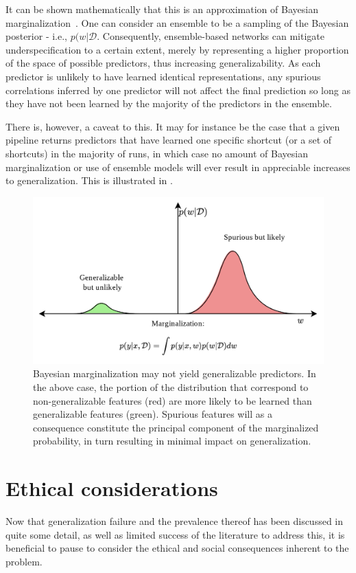 It can be shown mathematically that this is an approximation of Bayesian marginalization~\cite{bayesian_case,bayesian_generalization}. One can consider an ensemble to be a sampling of the Bayesian posterior - i.e., \(p(w | \mathcal{D}\).  Consequently, ensemble-based networks can mitigate underspecification to a certain extent, merely by representing a higher proportion of the space of possible predictors, thus increasing generalizability. As each predictor is unlikely to have learned identical representations, any spurious correlations inferred by one predictor will not affect the final prediction so long as they have not been learned by the majority of the predictors in the ensemble.

There is, however, a caveat to this. It may for instance be the case that a given pipeline returns predictors that have learned one specific shortcut (or a set of shortcuts) in the majority of runs, in which case no amount of Bayesian marginalization or use of ensemble models will ever result in appreciable increases to generalization. This is illustrated in . 
\begin{figure}[htb]
    \centering
    \includegraphics[width=\linewidth]{illustrations/bayesian.png}
    \caption[Bayesian Marginalization and Generalization]{Bayesian marginalization may not yield generalizable predictors. In the above case, the portion of the distribution that correspond to non-generalizable features (red) are more likely to be learned than generalizable features (green). Spurious features will as a consequence constitute the principal component of the marginalized probability, in turn resulting in minimal impact on generalization.}
    \label{fig:bayesian_generalization}
\end{figure}


\section{Ethical considerations}\label{ethics}
    Now that generalization failure and the prevalence thereof has been discussed in quite some detail, as well as limited success of the literature to address this, it is beneficial to pause to consider the ethical and social consequences inherent to the problem. 
    
